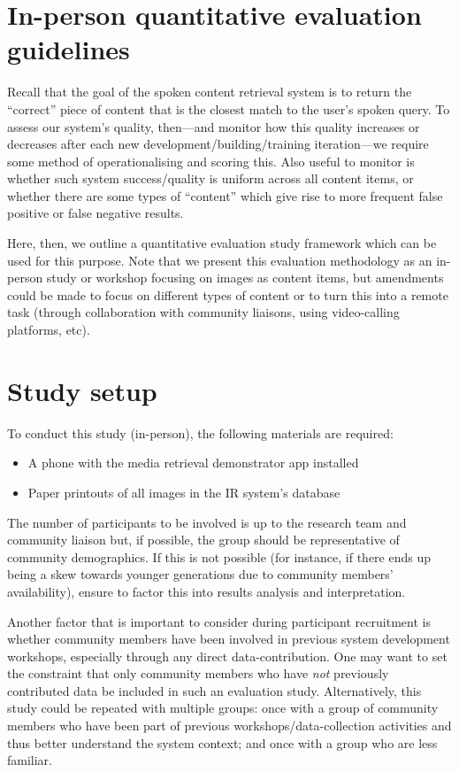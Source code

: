 \documentclass[10pt,twoside,openright]{report}
\begin{document}
\section{In-person quantitative evaluation guidelines}
Recall that the goal of the spoken content retrieval system is to return the ``correct'' piece of content that is the closest match to the user's spoken query.
To assess our system's quality, then---and monitor how this quality increases or decreases after each new development/building/training iteration---we require some method of operationalising and scoring this.
Also useful to monitor is whether such system success/quality is uniform across all content items, or whether there are some types of ``content'' which give rise to more frequent false positive or false negative results. 

Here, then, we outline a quantitative evaluation study framework which can be used for this purpose.
Note that we present this evaluation methodology as an in-person study or workshop focusing on images as content items, but amendments could be made to focus on different types of content or to turn this into a remote task (through collaboration with community liaisons, using video-calling platforms, etc).

 
\section{Study setup}
To conduct this study (in-person), the following materials are required:
\begin{itemize}
    \item A phone with the media retrieval demonstrator app installed
    \item Paper printouts of all images in the IR system's database
\end{itemize}

The number of participants to be involved is up to the research team and community liaison but, if possible, the group should be representative of community demographics.
If this is not possible (for instance, if there ends up being a skew towards younger generations due to community members' availability), ensure to factor this into results analysis and interpretation.

Another factor that is important to consider during participant recruitment is whether community members have been involved in previous system development workshops, especially through any direct data-contribution.
One may want to set the constraint that only community members who have \textit{not} previously contributed data be included in such an evaluation study.
Alternatively, this study could be repeated with multiple groups: once with a group of community members who have been part of previous workshops/data-collection activities and thus better understand the system context; and once with a group who are less familiar. 
\end{document}
